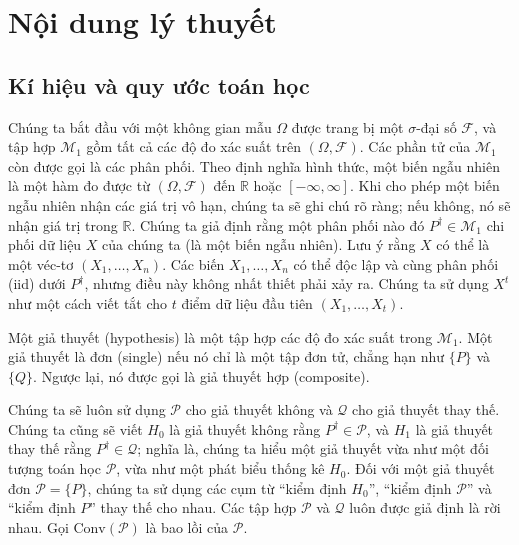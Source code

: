 \section{Nội dung lý thuyết}

\subsection{Kí hiệu và quy ước toán học}

Chúng ta bắt đầu với một không gian mẫu $\Omega$ được trang bị một $\sigma$-đại
số $\mathcal{F}$, và tập hợp $\mathcal{M}_1$ gồm tất cả các độ đo xác suất trên
$(\Omega, \mathcal{F})$. Các phần tử của $\mathcal{M}_1$ còn được gọi là các
phân phối. Theo định nghĩa hình thức, một biến ngẫu nhiên là một hàm đo được từ
$(\Omega, \mathcal{F})$ đến $\mathbb{R}$ hoặc $[-\infty, \infty]$. Khi cho phép
một biến ngẫu nhiên nhận các giá trị vô hạn, chúng ta sẽ ghi chú rõ ràng; nếu
không, nó sẽ nhận giá trị trong $\mathbb{R}$. Chúng ta giả định rằng một phân
phối nào đó $P^\dagger \in \mathcal{M}_1$ chi phối dữ liệu $X$ của chúng ta (là
một biến ngẫu nhiên). Lưu ý rằng $X$ có thể là một véc-tơ $(X_1, \dots, X_n)$.
Các biến $X_1, \dots, X_n$ có thể độc lập và cùng phân phối (iid) dưới
$P^\dagger$, nhưng điều này không nhất thiết phải xảy ra. Chúng ta sử dụng
$X^t$ như một cách viết tắt cho $t$ điểm dữ liệu đầu tiên $(X_1, \dots, X_t)$.

\begin{defn}
  Một giả thuyết (hypothesis) là một tập hợp các độ đo xác suất trong
  $\mathcal{M}_1$. Một giả thuyết là đơn (single) nếu nó chỉ là một tập đơn tử,
  chẳng hạn như $\{P\}$ và $\{Q\}$. Ngược lại, nó được gọi là giả thuyết hợp
  (composite).
\end{defn}

Chúng ta sẽ luôn sử dụng $\mathcal{P}$ cho giả thuyết không và $\mathcal{Q}$
cho giả thuyết thay thế. Chúng ta cũng sẽ viết $H_0$ là giả thuyết không rằng
$P^\dagger \in \mathcal{P}$, và $H_1$ là giả thuyết thay thế rằng $P^\dagger
\in \mathcal{Q}$; nghĩa là, chúng ta hiểu một giả thuyết vừa như một đối tượng
toán học $\mathcal{P}$, vừa như một phát biểu thống kê $H_0$. Đối với một giả
thuyết đơn $\mathcal{P} = \{P\}$, chúng ta sử dụng các cụm từ ``kiểm định
$H_0$'', ``kiểm định $\mathcal{P}$'' và ``kiểm định $P$'' thay thế cho nhau.
Các tập hợp $\mathcal{P}$ và $\mathcal{Q}$ luôn được giả định là rời nhau. Gọi
$\text{Conv}(\mathcal{P})$ là bao lồi của $\mathcal{P}$.

